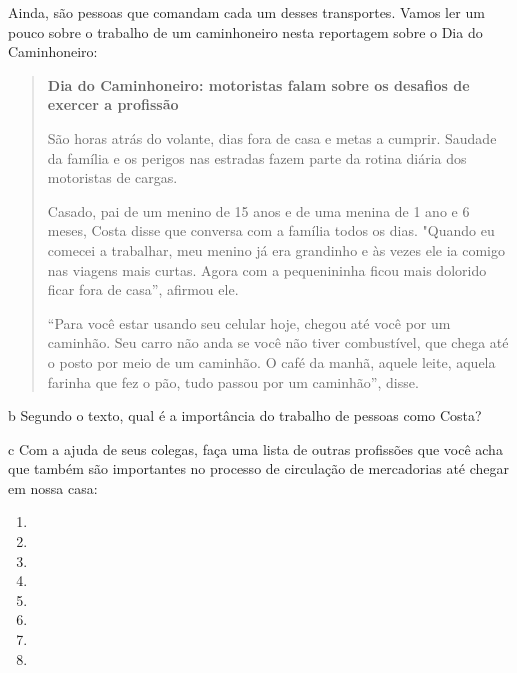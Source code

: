 Ainda, são pessoas que comandam cada um desses transportes. Vamos ler um
pouco sobre o trabalho de um caminhoneiro nesta reportagem sobre o Dia
do Caminhoneiro:

\begin{quote}
\textbf{Dia do Caminhoneiro: motoristas falam sobre os desafios de
exercer a profissão}

São horas atrás do volante, dias fora de casa e metas a cumprir. Saudade
da família e os perigos nas estradas fazem parte da rotina diária dos
motoristas de cargas.

Casado, pai de um menino de 15 anos e de uma menina de 1 ano e 6 meses,
Costa disse que conversa com a família todos os dias. "Quando eu comecei
a trabalhar, meu menino já era grandinho e às vezes ele ia comigo nas
viagens mais curtas. Agora com a pequenininha ficou mais dolorido ficar
fora de casa'', afirmou ele.

``Para você estar usando seu celular hoje, chegou até você por um
caminhão. Seu carro não anda se você não tiver combustível, que chega
até o posto por meio de um caminhão. O café da manhã, aquele leite,
aquela farinha que fez o pão, tudo passou por um caminhão'', disse.

\end{quote}

\num{b} Segundo o texto, qual é a importância do trabalho de pessoas como Costa?


\num{c} Com a ajuda de seus colegas, faça uma lista de outras profissões que
você acha que também são importantes no processo de circulação de
mercadorias até chegar em nossa casa:

\begin{enumerate}
\item \preencher

\item \preencher

\item \preencher

\item \preencher

\item \preencher

\item \preencher

\item \preencher

\item \preencher
\end{enumerate}

